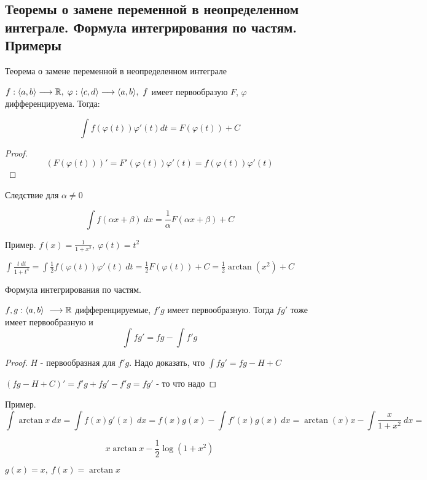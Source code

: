 \subsection{Теоремы о замене переменной в неопределенном интеграле. Формула интегрирования по частям. Примеры \href{https://youtu.be/p9C57KDo1Yg?t=5408}{\Walley}}

\begin{theorem-non}
    Теорема о замене переменной в неопределенном интеграле

    $f: \langle a, b \rangle \longrightarrow \mathbb{R}, \; \varphi: \langle c, d \rangle \longrightarrow \langle a, b \rangle,\ f$
    имеет первообразую $F$, $\varphi$ дифференцируема. Тогда:

    \[ \int f(\varphi(t))\varphi'(t) dt = F(\varphi(t))+C \]
\end{theorem-non}

\begin{proof}
    \[(F(\varphi(t)))' = F'(\varphi(t))\varphi'(t) = f(\varphi(t))\varphi'(t)\]
\end{proof}

Следствие для $\alpha \neq 0$

\[\int f(\alpha x + \beta)\ dx = \frac{1}{\alpha} F(\alpha x + \beta) + C \]

Пример. $f(x) = \frac{1}{1+x^2},\ \varphi(t) = t^2$

$\int \frac{t\ dt}{1+t^4} = \int \frac{1}{2}f(\varphi(t))\varphi'(t)\ dt
= \frac{1}{2} F(\varphi(t)) + C = \frac{1}{2} \arctan(x^2) + C$

\begin{theorem-non}
    Формула интегрирования по частям.

    $f, g: \langle a, b \rangle \ \longrightarrow \R$ дифференцируемые, $f'g$ имеет первообразную. Тогда
    $fg'$ тоже имеет первообразную и 
    \[ \int fg' = fg - \int f'g \]
\end{theorem-non}

\begin{proof}
    $H$ - первообразная для $f'g$. Надо доказать, что $\int fg' = fg - H + C$
    
    $(fg - H +C)' = f'g+fg'-f'g = fg'$ - то что надо
\end{proof}

Пример. \[\int \arctan x\ dx = \int f(x)g'(x)\ dx =
f(x)g(x)-\int f'(x)g(x)\ dx = \arctan(x)x - \int \frac{x}{1+x^2}\ dx = \]

\[ x\arctan x - \frac{1}{2} \log(1+x^2)\]

$g(x) = x,\ f(x) = \arctan x$